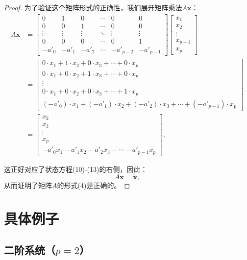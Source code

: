 \documentclass[12pt,a4paper]{article}
\newtheorem{proof}{证明}
\begin{document}
\begin{proof}
为了验证这个矩阵形式的正确性，我们展开矩阵乘法$A\mathbf{x}$：
\begin{align}
A\mathbf{x} &= \begin{bmatrix}
0 & 1 & 0 & \cdots & 0 & 0 \\
0 & 0 & 1 & \cdots & 0 & 0 \\
\vdots & \vdots & \vdots & \ddots & \vdots & \vdots \\
0 & 0 & 0 & \cdots & 0 & 1 \\
-a'_0 & -a'_1 & -a'_2 & \cdots & -a'_{p-2} & -a'_{p-1}
\end{bmatrix} \begin{bmatrix} x_1 \\ x_2 \\ \vdots \\ x_{p-1} \\ x_p \end{bmatrix} \\
&= \begin{bmatrix}
0 \cdot x_1 + 1 \cdot x_2 + 0 \cdot x_3 + \cdots + 0 \cdot x_p \\
0 \cdot x_1 + 0 \cdot x_2 + 1 \cdot x_3 + \cdots + 0 \cdot x_p \\
\vdots \\
0 \cdot x_1 + 0 \cdot x_2 + 0 \cdot x_3 + \cdots + 1 \cdot x_p \\
(-a'_0) \cdot x_1 + (-a'_1) \cdot x_2 + (-a'_2) \cdot x_3 + \cdots + (-a'_{p-1}) \cdot x_p
\end{bmatrix} \\
&= \begin{bmatrix}
x_2 \\
x_3 \\
\vdots \\
x_p \\
-a'_0 x_1 - a'_1 x_2 - a'_2 x_3 - \cdots - a'_{p-1} x_p
\end{bmatrix}.
\end{align}

这正好对应了状态方程(10)-(13)的右侧，因此：
\begin{equation}
A\mathbf{x} = \dot{\mathbf{x}},
\end{equation}
从而证明了矩阵$A$的形式(4)是正确的。
\end{proof}

\section{具体例子}

\subsection{二阶系统（$p=2$）}
\end{document}
